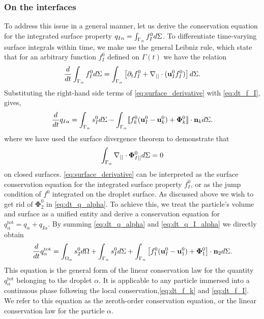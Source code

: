 \subsubsection{On the interfaces}
To address this issue in a general manner, let us derive the conservation equation for the integrated surface property $q_{I\alpha} = \int_{\Gamma_\alpha} f_I^0 d\Sigma$.
To differentiate time-varying surface integrals within time, we make use the general Leibniz rule, which state that for an arbitrary function $f_I^0$ defined on $\Gamma(t)$ we have the relation \citep{nadim1996concise}
\begin{equation}
    \frac{d}{d t}  \int_{\Gamma_\alpha} f_I^0  d\Sigma
    = \int_{\Gamma_\alpha}  \left[
        \partial_t f_I^0
        +   \mathbf{\nabla}_{||} \cdot (\textbf{u}_I^0f_I^0)
    \right] d\Sigma.
    \label{eq:surface_derivative}
\end{equation}
Substituting the right-hand side terms of \ref{eq:surface_derivative} with \ref{eq:dt_f_I}, gives,
\begin{equation}
    \frac{d}{d t}  q_{I\alpha}
    = \int_{\Gamma_\alpha}  
        s_I^0
     d\Sigma
    - \int_{\Gamma_\alpha} 
 \llbracket 
        f_k^0 (\textbf{u}_I^0 - \textbf{u}_k^0)
        + \mathbf{\Phi}_k^0
     \rrbracket \cdot \textbf{n}_k
     d\Sigma.
    \label{eq:dt_q_I_alpha}
\end{equation}
where we have used the surface divergence theorem \citep{nadim1996concise} to demonstrate that
\begin{equation}
    \int_{\Gamma_\alpha} \mathbf{\nabla}_{||}\cdot \bm\Phi_{I||}^0 d\Sigma
    = 0
    \label{eq:gauss_surface}
\end{equation} 
on closed surfaces. 
\ref{eq:surface_derivative} can be interpreted as the surface conservation equation for the integrated surface property $f_I^0$, or as the jump condition of $f^0$  integrated on the droplet surface. 
As discussed above we wish to get rid of $\mathbf{\Phi}_2^0$ in \ref{eq:dt_q_alpha}. 
To achieve this, we treat the particle's volume and surface as a unified entity and derive a conservation equation for $q_\alpha^\text{tot} = q_\alpha + q_{I\alpha}$. 
By summing \ref{eq:dt_q_alpha} and \ref{eq:dt_q_I_alpha} we directly obtain 
\begin{equation}
    \frac{d}{d t}  q_\alpha^\text{tot}
    = 
    \int_{\Omega_\alpha}  s_2^0  d\Omega
    + \int_{\Gamma_\alpha}  s_I^0  d\Sigma
    + \int_{\Gamma_\alpha}  \left[
        f_1^0 (\textbf{u}_I^0-\textbf{u}_1^0) 
        + \mathbf{\Phi}_1^0 
        \right] \cdot \textbf{n}_2  d\Sigma. 
    \label{eq:dt_q_alpha_tot}
\end{equation}
This equation is the general form of the linear conservation law for the quantity $q_\alpha^\text{tot}$ belonging to the droplet $\alpha$.
It is applicable to any particle immersed into a continuous phase following the local conservation,\ref{eq:dt_f_k} and \ref{eq:dt_f_I}.
We refer to this equation as the zeroth-order conservation equation, or the linear conservation law for the particle $\alpha$.

